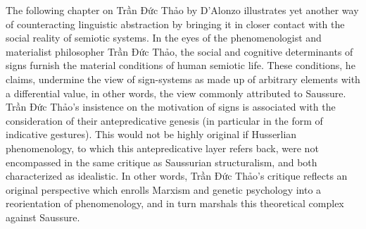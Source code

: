 \documentclass[output=paper]{langsci/langscibook}
\begin{document}
The following chapter on Trần Đức Thảo by D'Alonzo illustrates yet another way of counteracting linguistic abstraction by bringing it in closer contact with the social reality of semiotic systems. In the eyes of the phenomenologist and materialist philosopher Trần Đức Thảo, the social and cognitive determinants of signs furnish the material conditions of human semiotic life. These conditions, he claims, undermine the view of sign-systems as made up of arbitrary elements with a differential value, in other words, the view commonly attributed to Saussure. Trần Đức Thảo's insistence on the motivation of signs is associated with the consideration of their antepredicative genesis (in particular in the form of indicative gestures). This would not be highly original if Husserlian phenomenology, to which this antepredicative layer refers back, were not encompassed in the same critique as Saussurian structuralism, and both characterized as idealistic. In other words, Trần Đức Thảo's critique reflects an original perspective which enrolls Marxism and genetic psychology into a reorientation of phenomenology, and in turn marshals this theoretical complex against Saussure.

{\sloppy\printbibliography[heading=subbibliography,notkeyword=this]}
\end{document}

